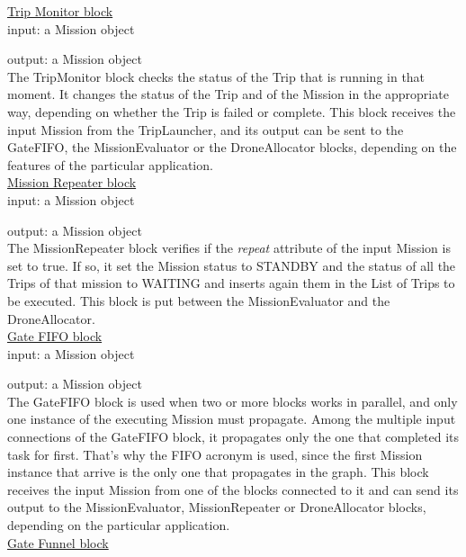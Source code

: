 \underline{Trip Monitor block}
\\

input: a Mission object

output: a Mission object
\\

The TripMonitor block checks the status of the Trip that is running in that moment.
It changes the status of the Trip and of the Mission in the appropriate way, depending on whether the Trip is failed or complete.
This block receives the input Mission from the TripLauncher, and its output can be sent to the GateFIFO, the MissionEvaluator or the DroneAllocator blocks, depending on the features of the particular application.
\\



\underline{Mission Repeater block}
\\

input: a Mission object

output: a Mission object
\\

The MissionRepeater block verifies if the \textit{repeat} attribute of the input Mission is set to true.
If so, it set the Mission status to STANDBY and the status of all the Trips of that mission to WAITING and inserts again them in the List of Trips to be executed.
This block is put between the MissionEvaluator and the DroneAllocator.
\\

\underline{Gate FIFO block}
\\

input: a Mission object

output: a Mission object
\\

The GateFIFO block is used when two or more blocks works in parallel, and only one instance of the executing Mission must propagate.
Among the multiple input connections of the GateFIFO block, it propagates only the one that completed its task for first.
That's why the FIFO acronym is used, since the first Mission instance that arrive is the only one that propagates in the graph.
This block receives the input Mission from one of the blocks connected to it and can send its output to the MissionEvaluator, MissionRepeater or DroneAllocator blocks, depending on the particular application.
\\

\underline{Gate Funnel block}
\\

